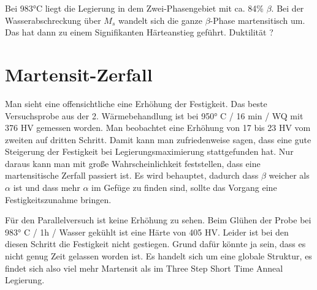Bei 983°C  liegt die Legierung in dem  Zwei-Phasengebiet mit ca. 84\% $\beta$. Bei der Wasserabschreckung über $M_s$ wandelt sich die ganze $\beta$-Phase martensitisch um. Das hat dann zu einem Signifikanten Härteanstieg geführt. Duktilität ?


\section{Martensit-Zerfall}

Man sieht eine offensichtliche eine Erhöhung der Festigkeit. Das beste Versuchsprobe aus der 2. Wärmebehandlung ist bei 950° C / 16 min / WQ mit 376 HV gemessen worden. Man beobachtet eine Erhöhung von 17 bis 23 HV vom zweiten auf dritten Schritt. Damit kann man zufriedenweise sagen, dass eine gute Steigerung der Festigkeit bei Legierungsmaximierung stattgefunden hat. Nur daraus kann man mit große Wahrscheinlichkeit feststellen, dass eine martensitische Zerfall passiert ist. Es wird behauptet, dadurch dass $\beta$ weicher als $\alpha$ ist und dass mehr $\alpha$ im Gefüge zu finden sind, sollte das Vorgang eine Festigkeitszunahme bringen. 

Für den Parallelversuch ist keine Erhöhung zu sehen. Beim Glühen der Probe bei 983° C / 1h / Wasser gekühlt ist eine Härte von 405 HV. Leider ist bei den diesen Schritt die Festigkeit nicht gestiegen. Grund dafür könnte ja sein, dass es nicht genug Zeit gelassen worden ist. Es handelt sich um eine globale Struktur, es findet sich also viel mehr Martensit als im Three Step Short Time Anneal Legierung. 
